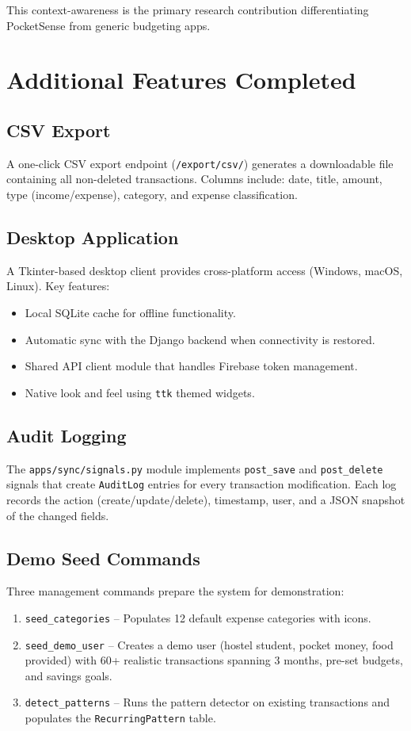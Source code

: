 \documentclass[12pt,a4paper]{article}
\begin{document}
This context-awareness is the primary research contribution differentiating PocketSense from generic budgeting apps.

\section{Additional Features Completed}

\subsection{CSV Export}
A one-click CSV export endpoint (\texttt{/export/csv/}) generates a downloadable file containing all non-deleted transactions.
Columns include: date, title, amount, type (income/expense), category, and expense classification.

\subsection{Desktop Application}
A Tkinter-based desktop client provides cross-platform access (Windows, macOS, Linux).
Key features:
\begin{itemize}
  \item Local SQLite cache for offline functionality.
  \item Automatic sync with the Django backend when connectivity is restored.
  \item Shared API client module that handles Firebase token management.
  \item Native look and feel using \texttt{ttk} themed widgets.
\end{itemize}

\subsection{Audit Logging}
The \texttt{apps/sync/signals.py} module implements \texttt{post\_save} and \texttt{post\_delete} signals that create \texttt{AuditLog} entries for every transaction modification.
Each log records the action (create/update/delete), timestamp, user, and a JSON snapshot of the changed fields.

\subsection{Demo Seed Commands}
Three management commands prepare the system for demonstration:
\begin{enumerate}
  \item \texttt{seed\_categories} -- Populates 12 default expense categories with icons.
  \item \texttt{seed\_demo\_user} -- Creates a demo user (hostel student, pocket money, food provided) with 60+ realistic transactions spanning 3 months, pre-set budgets, and savings goals.
  \item \texttt{detect\_patterns} -- Runs the pattern detector on existing transactions and populates the \texttt{RecurringPattern} table.
\end{enumerate}
\end{document}
